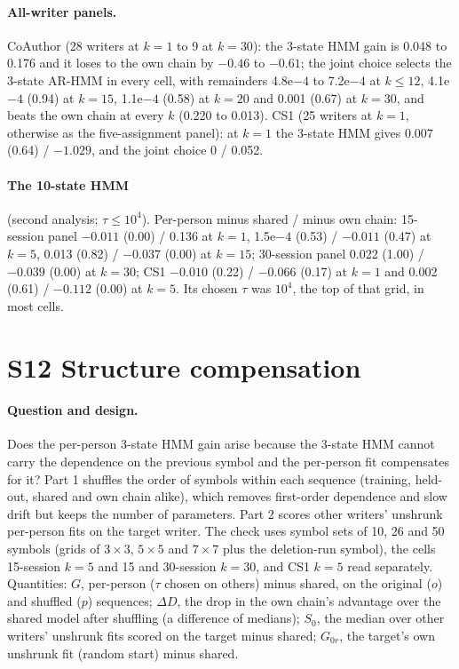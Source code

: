 \documentclass[10pt]{article}
\newcommand{\e}[2]{#1e$#2$}
\newcommand{\hmmthree}{\mbox{3-state} HMM}
\newcommand{\arthree}{\mbox{3-state} \mbox{AR-HMM}}
\newcommand{\Ssec}[2]{\section*{S#1\texorpdfstring{\quad}{ } #2}\addcontentsline{toc}{section}{S#1\texorpdfstring{\quad}{ } #2}\label{S#1}}
\begin{document}
\paragraph{All-writer panels.} CoAuthor (28 writers at $k=1$ to 9 at $k=30$): the \hmmthree{} gain is 0.048 to 0.176 and it loses to the own chain by $-0.46$ to $-0.61$; the joint choice selects the \arthree{} in every cell, with remainders \e{4.8}{-4} to \e{7.2}{-4} at $k\le12$, \e{4.1}{-4} (0.94) at $k=15$, \e{1.1}{-4} (0.58) at $k=20$ and 0.001 (0.67) at $k=30$, and beats the own chain at every $k$ (0.220 to 0.013). CS1 (25 writers at $k=1$, otherwise as the five-assignment panel): at $k=1$ the \hmmthree{} gives 0.007 (0.64) / $-1.029$, and the joint choice 0 / 0.052.

\paragraph{The 10-state HMM} (second analysis; $\tau\le10^4$). Per-person minus shared / minus own chain: 15-session panel $-0.011$ (0.00) / 0.136 at $k=1$, \e{1.5}{-4} (0.53) / $-0.011$ (0.47) at $k=5$, 0.013 (0.82) / $-0.037$ (0.00) at $k=15$; 30-session panel 0.022 (1.00) / $-0.039$ (0.00) at $k=30$; CS1 $-0.010$ (0.22) / $-0.066$ (0.17) at $k=1$ and 0.002 (0.61) / $-0.112$ (0.00) at $k=5$. Its chosen $\tau$ was $10^4$, the top of that grid, in most cells.

\Ssec{12}{Structure compensation}

\paragraph{Question and design.} Does the per-person \hmmthree{} gain arise because the \hmmthree{} cannot carry the dependence on the previous symbol and the per-person fit compensates for it? Part 1 shuffles the order of symbols within each sequence (training, held-out, shared and own chain alike), which removes first-order dependence and slow drift but keeps the number of parameters. Part 2 scores other writers' unshrunk per-person fits on the target writer. The check uses symbol sets of 10, 26 and 50 symbols (grids of $3\times3$, $5\times5$ and $7\times7$ plus the deletion-run symbol), the cells 15-session $k=5$ and 15 and 30-session $k=30$, and CS1 $k=5$ read separately. Quantities: $G$, per-person ($\tau$ chosen on others) minus shared, on the original ($o$) and shuffled ($p$) sequences; $\Delta D$, the drop in the own chain's advantage over the shared model after shuffling (a difference of medians); $S_0$, the median over other writers' unshrunk fits scored on the target minus shared; $G_{0r}$, the target's own unshrunk fit (random start) minus shared.
\end{document}

